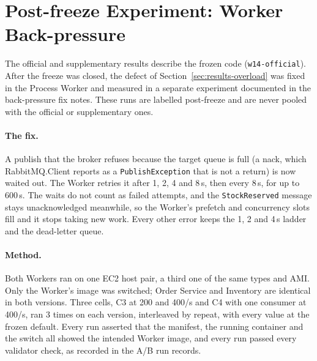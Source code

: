 \documentclass[a4paper]{report}
\begin{document}
\section{Post-freeze Experiment: Worker Back-pressure}
\label{sec:results-bp}

The official and supplementary results describe the frozen code
(\texttt{w14-official}). After the freeze was closed, the defect of
Section~\ref{sec:results-overload} was fixed in the Process Worker and measured
in a separate experiment documented in the back-pressure fix notes. These
runs are labelled post-freeze and are never pooled with the official or
supplementary ones.

\paragraph{The fix.} A publish that the broker refuses because the target
queue is full (a nack, which RabbitMQ.Client reports as a
\texttt{PublishException} that is not a return) is now waited out. The Worker
retries it after 1, 2, 4 and 8\,s, then every 8\,s, for up to 600\,s. The waits
do not count as failed attempts, and the \texttt{StockReserved} message stays
unacknowledged meanwhile, so the Worker's prefetch and concurrency slots fill and
it stops taking new work. Every other error keeps the 1, 2 and 4\,s ladder and
the dead-letter queue.

\paragraph{Method.} Both Workers ran on one EC2 host pair, a third one of the
same types and AMI. Only the Worker's image was switched; Order Service and
Inventory are identical in both versions. Three cells, C3 at 200 and 400/s and C4
with one consumer at 400/s, ran 3 times on each version, interleaved by repeat,
with every value at the frozen default. Every run asserted that the manifest,
the running container and the switch all showed the intended Worker image, and
every run passed every validator check, as recorded in the A/B run records.
\end{document}
